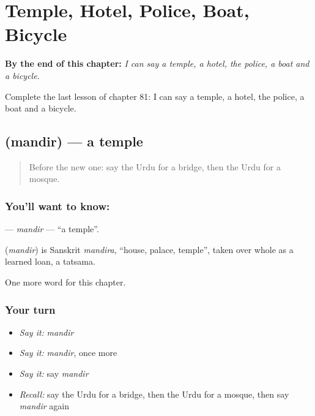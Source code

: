 
\chapter{Temple, Hotel, Police, Boat, Bicycle}
\label{ch:ur-temple-hotel-police-boat-bicycle}

\begin{chapteropening}
\textbf{By the end of this chapter:} \emph{I can say a temple, a hotel, the police, a boat and a bicycle.}

Complete the last lesson of chapter 81: I can say a temple, a hotel, the police, a boat and a bicycle.
\end{chapteropening}

\section[\texorpdfstring{\ur{مندر} (mandir)}{مندر (mandir)}]{ (mandir) — a temple}

\label{lesson:UR-C81-mandir}



\begin{quote}
Before the new one: say the Urdu for a bridge, then the Urdu for a mosque.
\end{quote}

\subsection*{You'll want to know: }
\textbf{} — \emph{mandir} — \textquotedblleft{}a temple\textquotedblright{}.

\begin{cousinweb}
\textbf{} (\emph{mandir}) is Sanskrit \emph{mandira}, \textquotedblleft{}house, palace, temple\textquotedblright{}, taken over whole as a learned loan, a tatsama.
\end{cousinweb}

\begin{grammarlens}[title={What you've built}]
One more word for this chapter.
\end{grammarlens}

\subsection*{Your turn}
\begin{itemize}
\raggedright
  \item \emph{Say it:} \emph{mandir}
  \item \emph{Say it:} \emph{mandir}, once more
  \item \emph{Say it:} say \emph{mandir}
  \item \emph{Recall:} say the Urdu for a bridge, then the Urdu for a mosque, then say \emph{mandir} again
\end{itemize}

